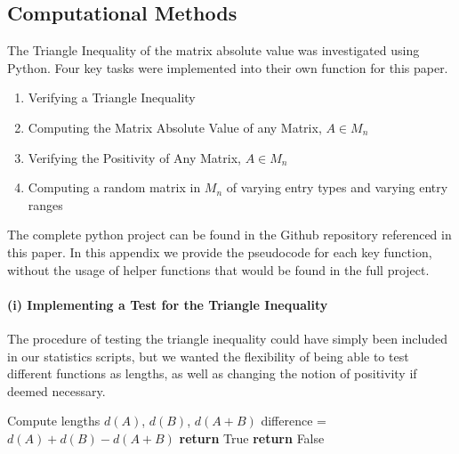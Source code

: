 \subsection[methods]{Computational Methods}

The Triangle Inequality of the matrix absolute value was investigated using Python. Four key tasks were implemented into their own function for this paper.

\begin{enumerate}
    \item Verifying a Triangle Inequality
    \item Computing the Matrix Absolute Value of any Matrix, $A \in M_n$
    \item Verifying the Positivity of Any Matrix, $A \in M_n$
    \item Computing a random matrix in $M_n$ of varying entry types and varying entry ranges
\end{enumerate}
The complete python project can be found in the Github repository referenced in this paper. In this appendix we provide the pseudocode for each key function, without the usage of helper functions that would be found in the full project.

\paragraph{\textbf{(i) Implementing a Test for the Triangle Inequality}} The procedure of testing the triangle inequality could have simply been included in our statistics scripts, but we wanted the flexibility of being able to test different functions as lengths, as well as changing the notion of positivity if deemed necessary.

\begin{algorithm}
    \caption{Check Triangle Inequality, \texttt{triangle\_inequality()}}
    \begin{algorithmic}[1]
        \STATE Compute lengths $d(A)$, $d(B)$, $d(A+B)$
        \STATE difference = $d(A) + d(B)-d(A+B)$
        \STATE \textbf{return} True
        \ELSE
        \STATE \textbf{return} False
        \ENDIF
    \end{algorithmic}
\end{algorithm}

